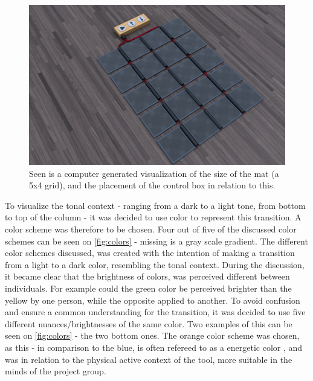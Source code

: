 \begin{figure}[H]
	\centering
	\includegraphics[width=0.8\linewidth]{figure/Design/finaldesign}
	\caption{Seen is a computer generated visualization of the size of the mat (a 5x4 grid), and the placement of the control box in relation to this.}
		\label{fig:matSize}
\end{figure}

To visualize the tonal context - ranging from a dark to a light tone, from bottom to top of the column - it was decided to use color to represent this transition. A color scheme was therefore to be chosen. Four out of five of the discussed color schemes can be seen on \autoref{fig:colors} - missing is a gray scale gradient. The different color schemes discussed, was created with the intention of making a transition from a light to a dark color, resembling the tonal context. During the discussion, it became clear that the brightness of colors, was perceived different between individuals. For example could the green color be perceived brighter than the yellow by one person, while the opposite applied to another. To avoid confusion and ensure a common understanding for the transition, it was decided to use five different nuances/brightnesses of the same color. Two examples of this can be seen on \autoref{fig:colors}  - the two bottom ones. The orange color scheme was chosen, as this - in comparison to the blue, is often refereed to as a energetic color \cite{orange}, and was in relation to the physical active context of the tool, more suitable in the minds of the project group.               

